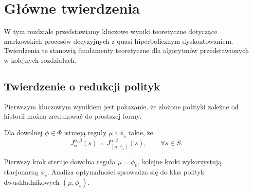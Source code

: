 \chapter{Główne twierdzenia}

W tym rozdziale przedstawiamy kluczowe wyniki teoretyczne dotyczące markowskich procesów decyzyjnych z quasi-hiperbolicznym dyskontowaniem. Twierdzenia te stanowią fundamenty teoretyczne dla algorytmów przedstawionych w kolejnych rozdziałach.

\section{Twierdzenie o redukcji polityk}

Pierwszym kluczowym wynikiem jest pokazanie, że złożone polityki zależne od historii można zredukować do prostszej formy.

\begin{theorem}
\label{thm:policy-reduction}
Dla dowolnej $\phi \in \Phi$ istnieją reguły $\mu$ i $\phi_s$ takie, że
\[
  J_{\phi}^{\alpha,\beta}(s) = J_{(\mu,\phi_s)}^{\alpha,\beta}(s), \qquad \forall s \in S.
\]
\end{theorem}

Pierwszy krok steruje dowolna reguła $\mu = \phi_0$, kolejne kroki wykorzystują stacjonarną $\phi_s$. Analiza optymalności sprowadza się do klas polityk dwuskładnikowych $(\mu,\phi_s)$.

